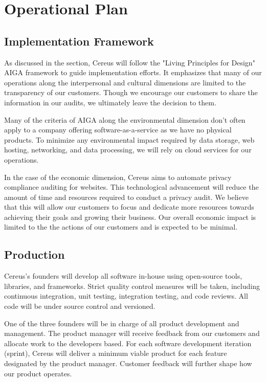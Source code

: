 {\let\cleardoublepage\relax \chapter*{Operational Plan}}

\section{Implementation Framework}

As discussed in the  section, Cereus will follow the "Living Principles for Design" AIGA framework \cite{brink.aiga.2020} to guide implementation efforts. It emphasizes that many of our operations along the interpersonal and cultural dimensions are limited to the transparency of our customers. Though we encourage our customers to share the information in our audits, we ultimately leave the decision to them.

Many of the criteria of AIGA along the environmental dimension don't often apply to a company offering software-as-a-service as we have no physical products. To minimize any environmental impact required by data storage, web hosting, networking, and data processing, we will rely on cloud services for our operations.

In the case of the economic dimension, Cereus aims to automate privacy compliance auditing for websites. This technological advancement will reduce the amount of time and resources required to conduct a privacy audit. We believe that this will allow our customers to focus and dedicate more resources towards achieving their goals and growing their business. Our overall economic impact is limited to the the actions of our customers and is expected to be minimal.

\section{Production}

Cereus's founders will develop all software in-house using open-source tools, libraries, and frameworks. Strict quality control measures will be taken, including continuous integration, unit testing, integration testing, and code reviews. All code will be under source control and versioned.

One of the three founders will be in charge of all product development and management. The product manager will receive feedback from our customers and allocate work to the developers based. For each software development iteration (sprint), Cereus will deliver a minimum viable product for each feature designated by the product manager. Customer feedback will further shape how our product operates.

